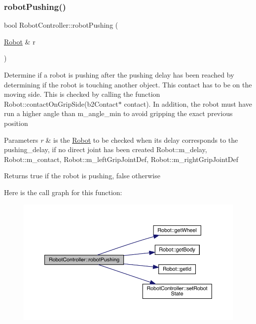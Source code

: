 \subsubsection{\texorpdfstring{robot\+Pushing()}{robotPushing()}}
{\footnotesize\ttfamily bool Robot\+Controller\+::robot\+Pushing (\begin{DoxyParamCaption}\item[{\mbox{\hyperlink{class_robot}{Robot}} \&}]{r }\end{DoxyParamCaption})}

Determine if a robot is pushing after the pushing delay has been reached by determining if the robot is touching another object. This contact has to be on the moving side. This is checked by calling the function Robot\+::contact\+On\+Grip\+Side(b2\+Contact$\ast$ contact). In addition, the robot must have run a higher angle than m\+\_\+angle\+\_\+min to avoid gripping the exact previous position 
\begin{DoxyParams}{Parameters}
{\em r} & is the \mbox{\hyperlink{class_robot}{Robot}} to be checked when its delay corresponds to the pushing\+\_\+delay, if no direct joint has been created  Robot\+::m\+\_\+delay, Robot\+::m\+\_\+contact, Robot\+::m\+\_\+left\+Grip\+Joint\+Def, Robot\+::m\+\_\+right\+Grip\+Joint\+Def \\
\hline
\end{DoxyParams}
\begin{DoxyReturn}{Returns}
true if the robot is pushing, false otherwise 
\end{DoxyReturn}
Here is the call graph for this function\+:\nopagebreak
\begin{figure}[H]
\begin{center}
\leavevmode
\includegraphics[width=350pt]{class_robot_controller_a927abf2765cd53b39acf128f318c3fe5_cgraph}
\end{center}
\end{figure}
\mbox{\label{class_robot_controller_a83d343eb8958d365624d06ac1b0b1b3d}} 
